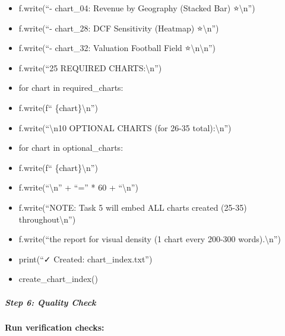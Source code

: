 \documentclass[11pt]{article}
\begin{document}
\begin{itemize}[leftmargin=*,itemsep=2pt,topsep=2pt]
\item {} f.write(``- chart\_\allowbreak{}04: Revenue by Geography (Stacked Bar) ⭐\textbackslash{}n'')
\item {} f.write(``- chart\_\allowbreak{}28: DCF Sensitivity (Heatmap) ⭐\textbackslash{}n'')
\item {} f.write(``- chart\_\allowbreak{}32: Valuation Football Field ⭐\textbackslash{}n\textbackslash{}n'')
\item {} f.write(``25 REQUIRED CHARTS:\textbackslash{}n'')
\item {} for chart in required\_\allowbreak{}charts:
\item {} f.write(f`` \{chart\}\textbackslash{}n'')
\item {} f.write(``\textbackslash{}n10 OPTIONAL CHARTS (for 26-35 total):\textbackslash{}n'')
\item {} for chart in optional\_\allowbreak{}charts:
\item {} f.write(f`` \{chart\}\textbackslash{}n'')
\item {} f.write(``\textbackslash{}n'' + ``='' * 60 + ``\textbackslash{}n'')
\item {} f.write(``NOTE: Task 5 will embed ALL charts created (25-35) throughout\textbackslash{}n'')
\item {} f.write(``the report for visual density (1 chart every 200-300 words).\textbackslash{}n'')
\item {} print(``✓ Created: chart\_\allowbreak{}index.txt'')
\item {} create\_\allowbreak{}chart\_\allowbreak{}index()
\end{itemize}

\subparagraph{Step 6: Quality Check}\mbox{}\par

\textbf{Run verification checks:}
\end{document}
